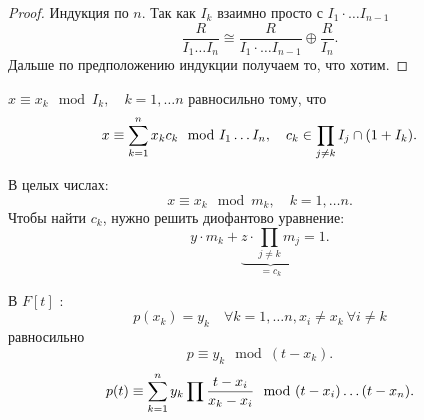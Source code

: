 \documentclass[12pt]{report}
\begin{document}
\begin{proof}
    Индукция по $ n$.
    Так как $ I_k$ взаимно просто с  $ I_1\cdot \ldots I_{n-1}$
    \[
	\frac{R}{I_1 \ldots I_n} \cong \frac{R}{I_1 \cdot \ldots I_{n-1} } \oplus \frac{R}{I_n}
    .\] 
    Дальше по предположению индукции получаем то, что хотим.
\end{proof}
\begin{st}
 $ x \equiv x_k \mod I_k, \quad k = 1, \ldots n$ равносильно тому, что \[
	x \equiv \sum\limits_{k=1}^{n} x_k c_k \mod I_1 \ldots I_n, \quad c_k \in  \prod_{j \ne k} I_j \cap (1 + I_k)
    .\] 
\end{st}
\begin{note}
    В целых числах:
    \[
    x \equiv x_k \mod m_k, \quad k = 1, \ldots  n
    .\] 
    Чтобы найти $ c_k$, нужно решить диофантово уравнение:
    \[
	y \cdot m_k + \underbrace{z \cdot \prod_{j \ne k} m_j}_{=c_k} = 1 
    .\] 
\end{note}
\begin{st}
    В $ F[t]$ :
    \[
	p(x_k) = y_k \quad \forall  k = 1, \ldots n, x_i \ne x_k  ~ \forall  i \ne k
    \] 
равносильно
    \[
	p \equiv y_k \mod (t - x_k)    
    .\] 
    \[
	p(t) \equiv \sum\limits_{k=1}^{n} y_k \prod \frac{t -x_i}{x_k - x_i} \mod (t - x_i) \ldots (t - x_n)
    .\] 
\end{st}
\end{document}
